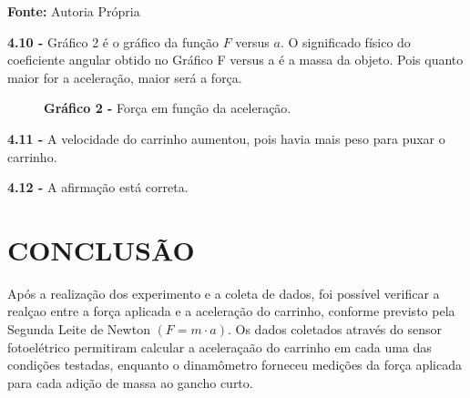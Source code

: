 \documentclass[article,12pt,oneside,a4paper,brazil]{abntex2}
\begin{document}
\begin{flushleft}
\begin{center}
\begin{table}[h!]
				\begin{adjustwidth}{0cm}{0cm}
					\begin{flushleft}
						\textbf{Fonte: }Autoria Própria
					\end{flushleft}
				\end{adjustwidth}
			\end{table}
		\end{center}
	
		\textbf{4.10 -} Gráfico 2 é o gráfico da função $F$ versus $a$. O significado físico do coeficiente angular obtido no Gráfico F versus a é a massa da objeto. Pois quanto maior for a aceleração, maior será a força.
		
		\begin{center}
			\begin{figure}[h!]
				\centering
				\begin{flushleft}
					\textbf{Gráfico 2 -} Força em função da aceleração.
				\end{flushleft}
				\label{fig:grafo-tabela2}
			\end{figure}
		\end{center}
	
		\textbf{4.11 -} A velocidade do carrinho aumentou, pois havia mais peso para puxar o carrinho.
		
		\textbf{4.12 -} A afirmação está correta.
	\end{flushleft}

	\section{CONCLUSÃO}
	
	Após a realização dos experimento e a coleta de dados, foi possível verificar a realçao entre a força aplicada e a aceleração do carrinho, conforme previsto pela Segunda Leite de Newton $(F = m \cdot a)$. Os dados coletados através do sensor fotoelétrico permitiram calcular a aceleraçaão do carrinho em cada uma das condições testadas, enquanto o dinamômetro forneceu medições da força aplicada para cada adição de massa ao gancho curto. 
	
\end{document}
